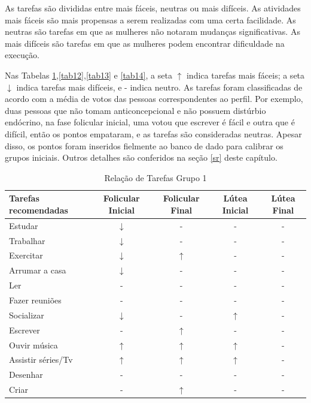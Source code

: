As tarefas são divididas entre mais fáceis, neutras ou mais difíceis. As atividades mais fáceis 
são mais propensas a serem realizadas com uma certa facilidade. As neutras são tarefas em que as mulheres não 
notaram mudanças significativas. As mais difíceis são tarefas em que as mulheres podem encontrar dificuldade 
na execução.

Nas Tabelas \ref{tab11},\ref{tab12},\ref{tab13} e \ref{tab14}, a seta $\uparrow$ indica tarefas mais fáceis; a seta $\downarrow$ indica tarefas mais difíceis, e - indica neutro. As tarefas 
foram classificadas de acordo com a média de votos das pessoas correspondentes ao perfil. Por exemplo, duas 
pessoas que não tomam anticoncepcional e não possuem distúrbio endócrino, na fase folicular inicial, 
uma votou que escrever é fácil e outra que é difícil, então os pontos empataram, e as tarefas são consideradas neutras.
Apesar disso, os pontos foram inseridos fielmente ao banco de dado para calibrar os grupos iniciais. Outros detalhes são conferidos
na seção \ref{sr} deste capítulo.

\begin{table}[ht]
    \centering
    \caption{Relação de Tarefas Grupo 1}
    \label{tab11}
    \begin{tabular}{lcccc}
    \toprule
    Tarefas recomendadas  & Folicular Inicial & Folicular Final  & Lútea Inicial& Lútea Final \\ 
    \midrule
    Estudar & $\downarrow$  & - & - & - \\ 
    \midrule
    Trabalhar & $\downarrow$ & -  & -&  -  \\ 
    \midrule
    Exercitar & $\downarrow$ & $\uparrow$ & - &  -  \\ 
    \midrule
    Arrumar a casa  & $\downarrow$ & -  & - & - \\ 
    \midrule
    Ler & - & -  & - & - \\ 
    \midrule
    Fazer reuniões & - & - & - & - \\ 
    \midrule
    Socializar & $\downarrow$ & - & $\uparrow$ & - \\ 
    \midrule
    Escrever & - & $\uparrow$  & - & - \\
    \midrule 
    Ouvir música & $\uparrow$ & $\uparrow$ & $\uparrow$ & - \\ 
    \midrule
    Assistir séries/Tv & $\uparrow$ & $\uparrow$ & $\uparrow$ & - \\ 
    \midrule
    Desenhar & - & -  & - & - \\ 
    \midrule
    Criar & - & $\uparrow$  & - & - \\ 
    \bottomrule    
    \end{tabular}
    \end{table}

